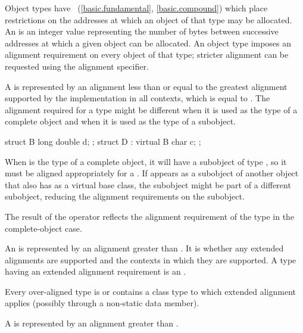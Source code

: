 \pnum
Object types have ~(\ref{basic.fundamental}, \ref{basic.compound})
which place restrictions on the addresses at which an object of that type
may be allocated. An  is an 
integer value representing the number of bytes between successive addresses
at which a given object can be allocated. An object type imposes an alignment
requirement on every object of that type; stricter alignment can be requested
using the alignment specifier.

\pnum
{}%
A  is represented by an alignment
less than or equal to the greatest alignment supported by the implementation in
all contexts, which is equal to
.
The alignment required for a type might be different when it is used as the type
of a complete object and when it is used as the type of a subobject. \begin{example}
\begin{codeblock}
struct B { long double d; };
struct D : virtual B { char c; };
\end{codeblock}

When  is the type of a complete object, it will have a subobject of
type , so it must be aligned appropriately for a .
If  appears as a subobject of another object that also has 
as a virtual base class, the  subobject might be part of a different
subobject, reducing the alignment requirements on the  subobject.
\end{example} The result of the  operator reflects the alignment
requirement of the type in the complete-object case.

\pnum
{}%
%
%
An  is represented by an alignment
greater than . It is 
whether any extended alignments are supported and the contexts in which they are
supported. A type having an extended alignment
requirement is an . \begin{note}
Every over-aligned type is or contains a class type
to which extended alignment applies (possibly through a non-static data member).
\end{note}
A  is represented by
an alignment greater than .

